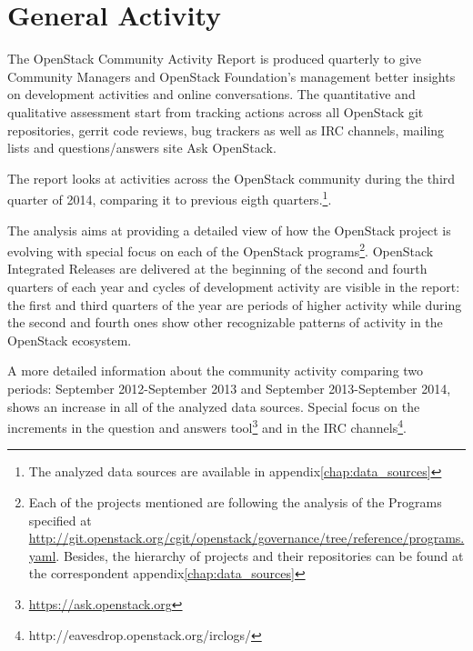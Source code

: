 \documentclass[a4wide,11pt]{report}
\begin{document}
\section{General Activity}

The OpenStack Community Activity Report is produced quarterly to give Community Managers and OpenStack Foundation's management better insights on development activities and online conversations. The  quantitative and qualitative assessment start from tracking actions across all OpenStack git repositories, gerrit code reviews, bug trackers as well as IRC channels, mailing lists and questions/answers site Ask OpenStack.

The report looks at activities across the OpenStack community during the third quarter of 2014, comparing it to previous eigth quarters.\footnote{The analyzed data sources are available in appendix\ref{chap:data_sources}}. 

The analysis aims at providing a detailed view of how the OpenStack project is evolving with special focus on each of the OpenStack programs\footnote{Each of the projects mentioned are following the analysis of the Programs specified at \url{http://git.openstack.org/cgit/openstack/governance/tree/reference/programs.yaml}. Besides, the hierarchy of projects and their repositories can be found at the correspondent appendix\ref{chap:data_sources}}. OpenStack Integrated Releases are delivered at the beginning of the second and fourth quarters of each year and cycles of development activity are visible in the report: the first and third quarters of the year are periods of higher activity while during the second and fourth ones show other recognizable patterns of activity in the OpenStack ecosystem.


A more detailed information about the community activity comparing two periods: September 2012-September 2013 and September 2013-September 2014, shows an increase in all of the analyzed data sources. Special focus on the increments in the question and answers tool\footnote{\url{https://ask.openstack.org}} and in the IRC channels\footnote{http://eavesdrop.openstack.org/irclogs/}.
\end{document}
